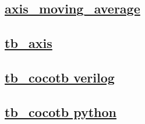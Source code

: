 \documentclass{article}
\begin{document}
  


  \subsection{\href{../files/axis_moving_average-v.html}{axis\_moving\_average}}
  \subsection{\href{../files2/tb_axis-v.html}{tb\_axis}}
  \subsection{\href{../files2/tb_cocotb-v.html}{tb\_cocotb verilog}}
  \subsection{\href{../files2/tb_cocotb-py.html}{tb\_cocotb python}}
\end{document}
